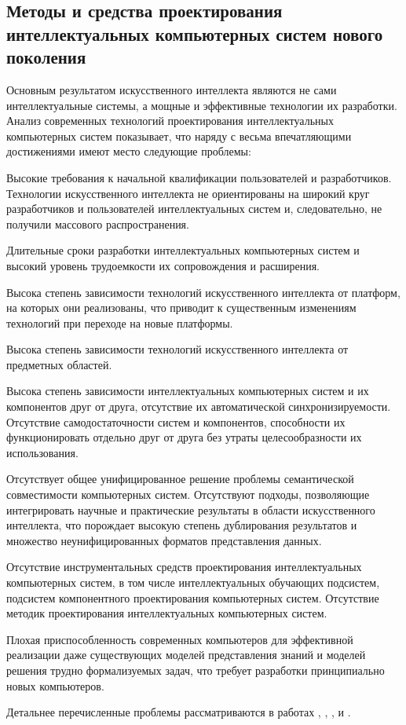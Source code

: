 
\begin{partbacktext}
\part{Методы и средства проектирования интеллектуальных компьютерных систем нового поколения}
\noindent
Основным результатом искусственного интеллекта являются не сами интеллектуальные системы, а мощные и эффективные технологии их разработки. Анализ современных технологий проектирования интеллектуальных компьютерных систем показывает, что наряду с весьма впечатляющими достижениями имеют место следующие проблемы:
\begin{textitemize}
	\item{Высокие требования к начальной квалификации пользователей и разработчиков. Технологии искусственного интеллекта не ориентированы на широкий круг разработчиков и пользователей интеллектуальных систем и, следовательно, не получили массового распространения.}
	\item{Длительные сроки разработки интеллектуальных компьютерных систем и высокий уровень трудоемкости их сопровождения и расширения.}
	\item{Высока степень зависимости технологий искусственного интеллекта от платформ, на которых они реализованы, что приводит к существенным изменениям технологий при переходе на новые платформы.}
	\item{Высока степень зависимости технологий искусственного интеллекта от предметных областей.}
	\item{Высока степень зависимости интеллектуальных компьютерных систем и их компонентов друг от друга, отсутствие их автоматической синхронизируемости. Отсутствие самодостаточности систем и компонентов, способности их функционировать отдельно друг от друга без утраты целесообразности их использования.}
	\item{Отсутствует общее унифицированное решение проблемы семантической совместимости компьютерных систем. Отсутствуют подходы, позволяющие интегрировать научные и практические результаты в области искусственного интеллекта, что порождает высокую степень дублирования результатов и множество неунифицированных форматов представления данных.}
	\item{Отсутствие инструментальных средств проектирования интеллектуальных компьютерных систем, в том числе интеллектуальных обучающих подсистем, подсистем компонентного проектирования компьютерных систем. Отсутствие методик проектирования интеллектуальных компьютерных систем.}
	\item{Плохая приспособленность современных компьютеров для эффективной реализации даже существующих моделей представления знаний и моделей решения трудно формализуемых задач, что требует разработки принципиально новых компьютеров.}
\end{textitemize}
Детальнее перечисленные проблемы рассматриваются в работах , , ,  и .


\end{partbacktext}
